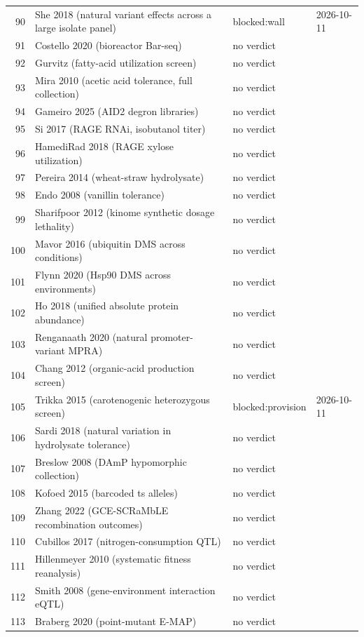 \begin{longtable}{@{}r L{88mm} L{40mm} L{24mm}@{}}
90 & She 2018 (natural variant effects across a large isolate panel) & blocked:wall & 2026-10-11 \\
91 & Costello 2020 (bioreactor Bar-seq) & no verdict &  \\
92 & Gurvitz (fatty-acid utilization screen) & no verdict &  \\
93 & Mira 2010 (acetic acid tolerance, full collection) & no verdict &  \\
94 & Gameiro 2025 (AID2 degron libraries) & no verdict &  \\
95 & Si 2017 (RAGE RNAi, isobutanol titer) & no verdict &  \\
96 & HamediRad 2018 (RAGE xylose utilization) & no verdict &  \\
97 & Pereira 2014 (wheat-straw hydrolysate) & no verdict &  \\
98 & Endo 2008 (vanillin tolerance) & no verdict &  \\
99 & Sharifpoor 2012 (kinome synthetic dosage lethality) & no verdict &  \\
100 & Mavor 2016 (ubiquitin DMS across conditions) & no verdict &  \\
101 & Flynn 2020 (Hsp90 DMS across environments) & no verdict &  \\
102 & Ho 2018 (unified absolute protein abundance) & no verdict &  \\
103 & Renganaath 2020 (natural promoter-variant MPRA) & no verdict &  \\
104 & Chang 2012 (organic-acid production screen) & no verdict &  \\
105 & Trikka 2015 (carotenogenic heterozygous screen) & blocked:provision & 2026-10-11 \\
106 & Sardi 2018 (natural variation in hydrolysate tolerance) & no verdict &  \\
107 & Breslow 2008 (DAmP hypomorphic collection) & no verdict &  \\
108 & Kofoed 2015 (barcoded ts alleles) & no verdict &  \\
109 & Zhang 2022 (GCE-SCRaMbLE recombination outcomes) & no verdict &  \\
110 & Cubillos 2017 (nitrogen-consumption QTL) & no verdict &  \\
111 & Hillenmeyer 2010 (systematic fitness reanalysis) & no verdict &  \\
112 & Smith 2008 (gene-environment interaction eQTL) & no verdict &  \\
113 & Braberg 2020 (point-mutant E-MAP) & no verdict &  \\

\end{longtable}
